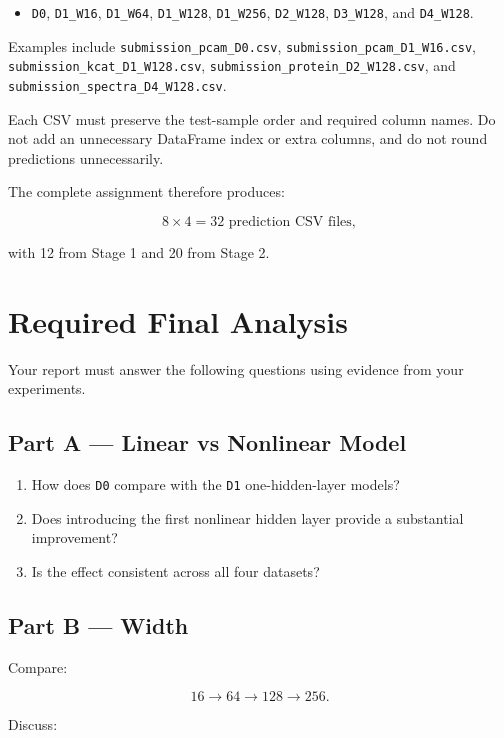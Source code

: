 \documentclass[11pt,a4paper]{article}
\newcommand{\code}[1]{\texttt{#1}}
\begin{document}
\begin{itemize}
    \item \code{D0}, \code{D1\_W16}, \code{D1\_W64}, \code{D1\_W128}, \code{D1\_W256},
    \code{D2\_W128}, \code{D3\_W128}, and \code{D4\_W128}.
\end{itemize}

Examples include \code{submission\_pcam\_D0.csv}, \code{submission\_pcam\_D1\_W16.csv},
\code{submission\_kcat\_D1\_W128.csv}, \code{submission\_protein\_D2\_W128.csv}, and
\code{submission\_spectra\_D4\_W128.csv}.

Each CSV must preserve the test-sample order and required column names. Do not add an unnecessary DataFrame index or extra columns, and do not round predictions unnecessarily.

The complete assignment therefore produces:

\[
8\times4=\boxed{32\text{ prediction CSV files}},
\]

with 12 from Stage 1 and 20 from Stage 2.

\section{Required Final Analysis}

Your report must answer the following questions using evidence from your experiments.

\subsection*{Part A --- Linear vs Nonlinear Model}

\begin{enumerate}
    \item How does \code{D0} compare with the \code{D1} one-hidden-layer models?
    \item Does introducing the first nonlinear hidden layer provide a substantial improvement?
    \item Is the effect consistent across all four datasets?
\end{enumerate}

\subsection*{Part B --- Width}

Compare:

\[
16\rightarrow64\rightarrow128\rightarrow256.
\]

Discuss:
\end{document}
